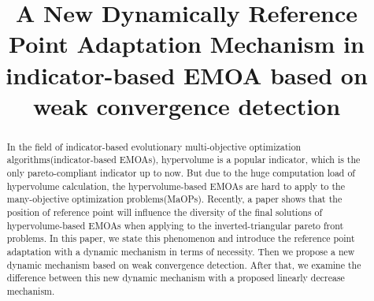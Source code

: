 \documentclass[conference]{IEEEtran}
\begin{document}
\title{A New Dynamically Reference Point Adaptation Mechanism in indicator-based EMOA
based on weak convergence detection}



\author{ %
}


\maketitle

\begin{abstract}
In the field of indicator-based evolutionary multi-objective optimization algorithms(indicator-based EMOAs), 
hypervolume is a popular indicator, which is the only pareto-compliant indicator up to now. 
But due to the huge computation load of hypervolume calculation, 
the hypervolume-based EMOAs are hard to apply to the many-objective optimization problems(MaOPs). 
Recently, a paper shows that the position of reference point will influence the diversity of the final solutions of
hypervolume-based EMOAs when applying to the inverted-triangular pareto front problems. 
In this paper, we state this phenomenon and introduce the reference point adaptation with a dynamic mechanism in terms of necessity.
Then we propose a new dynamic mechanism based on weak convergence detection. 
After that, we examine the difference between this new dynamic mechanism with a proposed linearly decrease mechanism. 
\end{abstract}
\end{document}
